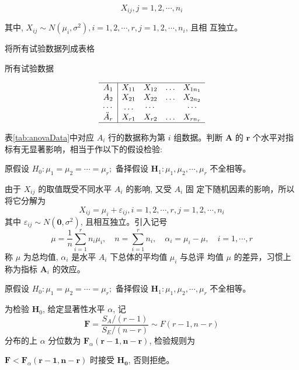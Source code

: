 $$
X_{i j}, j=1,2, \cdots, n_{i}
$$

其中, $X_{i j} \sim N\left(\mu_{i}, \sigma^{2}\right), i=1,2, \cdots, r, j=1,2, \cdots, n_{i}$, 且相
互独立。

将所有试验数据列成表格

\begin{table}
\caption{所有试验数据}
      \label{tab:anovaData}
$$\begin{array}{c|cccc}
    \hline A_{1} & X_{11} & X_{12} & \ldots & X_{1 n_{1}} \\
    A_{2} & X_{21} & X_{22} & \ldots & X_{2 n_{2}} \\
    \cdots & \ldots & \cdots & & \cdots \\
    \ddot{A}_{r} & X_{r 1} & X_{r 2} & \ldots & X_{r n_{r}} \\
    \hline
    \end{array}
$$  
\end{table}


表\cref{tab:anovaData}中对应 $A_{i}$ 行的数据称为第 $i$ 组数据。判断 $\boldsymbol{A}$ 的 $\boldsymbol{r}$ 个水平对指标有无显著影响，相当于作以下的假设检验:

原假设 $H_{0}: \mu_{1}=\mu_{2}=\cdots=\mu_{r} ;$
备择假设 $\boldsymbol{H}_{1}: \mu_{1}, \mu_{2}, \cdots, \mu_{r}$ 不全相等。

由于 \( X_{i j} \) 的取值既受不同水平 \( A_{i} \) 的影响, 又受 \( A_{i} \) 固 定下随机因素的影响，所以将它分解为
$$
X_{i j}=\mu_{i}+\varepsilon_{i j}, i=1,2, \cdots, r, j=1,2, \cdots, n_{i}\label{eq:anovaDecomposition}
$$
其中 \( \varepsilon_{i j} \sim N\left(\mathbf{0}, \sigma^{2}\right) \), 且相互独立。引入记号
$$
\mu=\frac{1}{n} \sum_{i=1}^{r} n_{i} \mu_{i}, \quad n=\sum_{i=1}^{r} n_{i}, \quad \alpha_{i}=\mu_{i}-\mu, \quad i=1, \cdots, r
$$
称 \( \mu \) 为总均值, \( \alpha_{i} \) 是水平 \( A_{i} \) 下总体的平均值 \( \mu_{i} \) 与总评
均值 \( \mu \) 的差异，习惯上称为指标 \( \boldsymbol{A}_{i} \) 的效应。

\begin{definition}
原假设 $H_{0}: \mu_{1}=\mu_{2}=\cdots=\mu_{r} ;$
备择假设 $\boldsymbol{H}_{1}: \mu_{1}, \mu_{2}, \cdots, \mu_{r}$ 不全相等。

为检验 \( \boldsymbol{H}_{0} \), 给定显著性水平 \( \alpha \), 记 \[ \boldsymbol{F}=\frac{S_{A} /(r-1)}{S_{E} /(n-r)} \sim F(r-1, n-r) \] 分布的上 \( \alpha \) 分位数为 \( \boldsymbol{F}_{\alpha}(\boldsymbol{r}-\mathbf{1}, \boldsymbol{n}-\boldsymbol{r}) \), 检验规则为

\( \boldsymbol{F}<\boldsymbol{F}_{\alpha}(\boldsymbol{r}-\mathbf{1}, \boldsymbol{n}-\boldsymbol{r}) \) 时接受 \( \boldsymbol{H}_{\mathbf{0}} \), 否则拒绝。
\end{definition}

